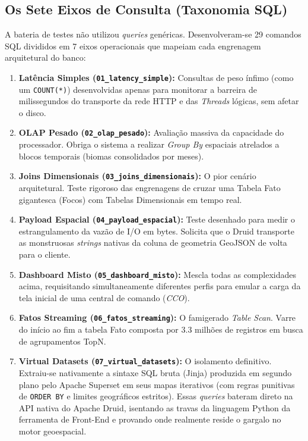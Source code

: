 \subsection{Os Sete Eixos de Consulta (Taxonomia SQL)}
A bateria de testes não utilizou \textit{queries} genéricas. Desenvolveram-se 29 comandos SQL divididos em 7 eixos operacionais que mapeiam cada engrenagem arquitetural do banco:

\begin{enumerate}
    \item \textbf{Latência Simples (\texttt{01\_latency\_simple}):} Consultas de peso ínfimo (como um \texttt{COUNT(*)}) desenvolvidas apenas para monitorar a barreira de milissegundos do transporte da rede HTTP e das \textit{Threads} lógicas, sem afetar o disco.
    \item \textbf{OLAP Pesado (\texttt{02\_olap\_pesado}):} Avaliação massiva da capacidade do processador. Obriga o sistema a realizar \textit{Group By} espaciais atrelados a blocos temporais (biomas consolidados por meses).
    \item \textbf{Joins Dimensionais (\texttt{03\_joins\_dimensionais}):} O pior cenário arquitetural. Teste rigoroso das engrenagens de cruzar uma Tabela Fato gigantesca (Focos) com Tabelas Dimensionais em tempo real.
    \item \textbf{Payload Espacial (\texttt{04\_payload\_espacial}):} Teste desenhado para medir o estrangulamento da vazão de I/O em bytes. Solicita que o Druid transporte as monstruosas \textit{strings} nativas da coluna de geometria GeoJSON de volta para o cliente.
    \item \textbf{Dashboard Misto (\texttt{05\_dashboard\_misto}):} Mescla todas as complexidades acima, requisitando simultaneamente diferentes perfis para emular a carga da tela inicial de uma central de comando (\textit{CCO}).
    \item \textbf{Fatos Streaming (\texttt{06\_fatos\_streaming}):} O famigerado \textit{Table Scan}. Varre do início ao fim a tabela Fato composta por $3.3$ milhões de registros em busca de agrupamentos TopN.
    \item \textbf{Virtual Datasets (\texttt{07\_virtual\_datasets}):} O isolamento definitivo. Extraiu-se nativamente a sintaxe SQL bruta (Jinja) produzida em segundo plano pelo Apache Superset em seus mapas iterativos (com regras punitivas de \texttt{ORDER BY} e limites geográficos estritos). Essas \textit{queries} bateram direto na API nativa do Apache Druid, isentando as travas da linguagem Python da ferramenta de Front-End e provando onde realmente reside o gargalo no motor geoespacial.
\end{enumerate}

